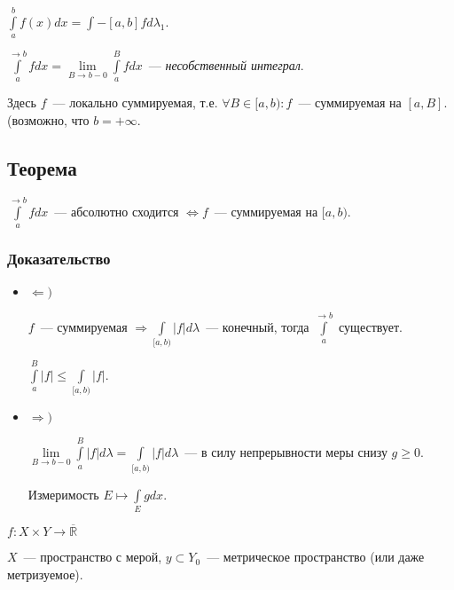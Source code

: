 \documentclass{article}
\begin{document}
        $\int\limits^b_a f(x) dx = \int\limits-{[a, b]} f d \lambda_1$.
        
        $\int\limits^{\rightarrow b}_a f dx = \lim\limits_{B \rightarrow b - 0} \int\limits^B_a f dx$~--- \textit{несобственный интеграл}.
        
        Здесь $f$~--- локально суммируемая, т.е. $\forall B \in [a, b) : f$~--- суммируемая на $[a, B]$. (возможно, что $b = +\infty$.
        
    \subsection{Теорема}
    
        $\int\limits^{\rightarrow b}_a f dx$~--- абсолютно сходится $\Longleftrightarrow f$~--- суммируемая на $[a, b)$.
        
        \subsubsection{Доказательство}
        
            \begin{itemize}
            
                \item $\Leftarrow)$ 
                
                    $f$~--- суммируемая $\Rightarrow \int\limits_{[a, b)} |f| d\lambda$~--- конечный, тогда $\int\limits^{\rightarrow b}_a$ существует.
                
                    $\int\limits^B_a |f| \leqslant \int\limits_{[a, b)} |f|$.
                    
                \item $\Rightarrow)$
                
                    $\lim\limits_{B \rightarrow b - 0} \int\limits^B_a |f| d \lambda = \int\limits_{[a, b)} |f| d \lambda$~--- в силу непрерывности меры снизу $g \geqslant 0$.
                    
                    Измеримость $E \mapsto \int\limits_{E} g dx$.
                
            \end{itemize}
            
    $f : X \times Y \rightarrow \overline{\mathbb{R}}$
    
    $X$~--- пространство с мерой, $y \subset Y_0$~--- метрическое пространство (или даже метризуемое).
    
\end{document}
